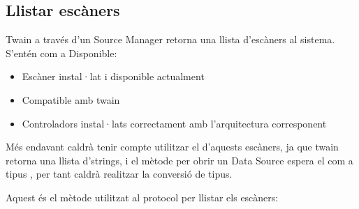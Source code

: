 \documentclass[letterpaper,11pt,catalan]{sphinxmanual}
\begin{document}
\subsection{Llistar escàners}
\label{\detokenize{index:llistar-escaners}}
Twain a través d'un Source Manager retorna una llista d'escàners  al
sistema. S'entén com a Disponible:
\begin{itemize}
\item {} 
Escàner instal·lat i disponible actualment

\item {} 
Compatible amb twain

\item {} 
Controladors instal·lats correctament amb l'arquitectura corresponent

\end{itemize}

Més endavant caldrà tenir compte utilitzar el  d'aquests escàners, ja que
twain retorna una llista d'strings, i el mètode per obrir un Data Source espera el 
com a tipus , per tant caldrà realitzar la conversió de tipus.

Aquest és el mètode utilitzat al protocol per llistar els escàners:

\begin{sphinxVerbatim}[commandchars=\\\{\}]
 
      
          
         
             
         
             \PYG{p}{[}\PYG{p}{]}
             \PYG{p}{[}\PYG{p}{]}
         
             \PYG{p}{[}\PYG{p}{]}
\end{sphinxVerbatim}
\end{document}
